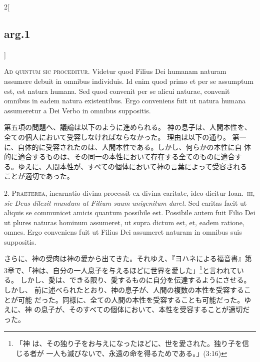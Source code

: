 \documentclass[paper=a4paper,fontsize=10pt,jafontsize=9pt,titlepage]{jlreq}
\begin{document}
\begin{paracol}{2}[\subsection{arg.1}]

{\Huge A}{\scshape d quintum sic proceditur}. Videtur quod Filius Dei humanam naturam
assumere debuit in omnibus individuis. Id enim quod primo et per se
assumptum est, est natura humana. Sed quod convenit per se alicui
naturae, convenit omnibus in eadem natura existentibus. Ergo conveniens
fuit ut natura humana assumeretur a Dei Verbo in omnibus suppositis.

\switchcolumn

第五項の問題へ、議論は以下のように進められる。
神の息子は、人間本性を、全ての個人において受容しなければならなかった。
理由は以下の通り。
第一に、自体的に受容されたのは、人間本性である。しかし、何らかの本性に自
 体的に適合するものは、その同一の本性において存在する全てのものに適合す
 る。ゆえに、人間本性が、すべての個体において神の言葉によって受容される
 ことが適切であった。


2. {\scshape Praeterea}, incarnatio divina processit ex divina caritate, ideo dicitur
Ioan.~{\scshape iii}, {\itshape sic Deus dilexit mundum ut Filium suum unigenitum daret}. Sed
caritas facit ut aliquis se communicet amicis quantum possibile
est. Possibile autem fuit Filio Dei ut plures naturas hominum assumeret,
ut supra dictum est, et, eadem ratione, omnes. Ergo conveniens fuit ut
Filius Dei assumeret naturam in omnibus suis suppositis.

\switchcolumn

さらに、神の受肉は神の愛から出てきた。それゆえ、『ヨハネによる福音書』第
 3章で、「神は、自分の一人息子を与えるほどに世界を愛した」\footnote{「神
 は、その独り子をお与えになったほどに、世を愛された。独り子を信じる者が
 一人も滅びないで、永遠の命を得るためである。」(3:16)}と言われている。
しかし、愛は、できる限り、愛するものに自分を伝達するようにさせる。しかし、
 前に述べられたとおり、神の息子が、人間の複数の本性を受容することが可能
 だった。同様に、全ての人間の本性を受容することも可能だった。ゆえに、神
 の息子が、そのすべての個体において、本性を受容することが適切だった。



\end{paracol}
\end{document}
